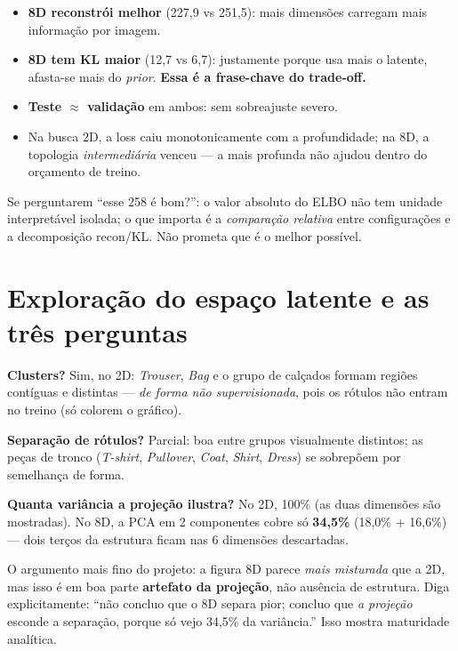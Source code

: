 \documentclass[11pt,a4paper]{article}
\begin{document}
\begin{itemize}[leftmargin=1.2em, itemsep=0.1em]
\item \textbf{8D reconstrói melhor} (227,9 vs 251,5): mais dimensões carregam
mais informação por imagem.
\item \textbf{8D tem KL maior} (12,7 vs 6,7): justamente porque usa mais o
latente, afasta-se mais do \textit{prior}. \textbf{Essa é a frase-chave do
trade-off.}
\item \textbf{Teste $\approx$ validação} em ambos: sem sobreajuste severo.
\item Na busca 2D, a loss caiu monotonicamente com a profundidade; na 8D, a
topologia \emph{intermediária} venceu --- a mais profunda não ajudou dentro do
orçamento de treino.
\end{itemize}

\begin{dica}
Se perguntarem ``esse 258 é bom?'': o valor absoluto do ELBO não tem unidade
interpretável isolada; o que importa é a \emph{comparação relativa} entre
configurações e a decomposição recon/KL. Não prometa que é o melhor possível.
\end{dica}

\section{Exploração do espaço latente e as três perguntas}

\textbf{Clusters?} Sim, no 2D: \textit{Trouser}, \textit{Bag} e o grupo de
calçados formam regiões contíguas e distintas --- \emph{de forma não
supervisionada}, pois os rótulos não entram no treino (só colorem o gráfico).

\textbf{Separação de rótulos?} Parcial: boa entre grupos visualmente distintos;
as peças de tronco (\textit{T-shirt}, \textit{Pullover}, \textit{Coat},
\textit{Shirt}, \textit{Dress}) se sobrepõem por semelhança de forma.

\textbf{Quanta variância a projeção ilustra?} No 2D, 100\% (as duas dimensões
são mostradas). No 8D, a PCA em 2 componentes cobre só \textbf{34,5\%}
(18,0\% + 16,6\%) --- dois terços da estrutura ficam nas 6 dimensões
descartadas.

\begin{dica}
O argumento mais fino do projeto: a figura 8D parece \emph{mais misturada} que a
2D, mas isso é em boa parte \textbf{artefato da projeção}, não ausência de
estrutura. Diga explicitamente: ``não concluo que o 8D separa pior; concluo que
\emph{a projeção} esconde a separação, porque só vejo 34,5\% da variância.''
Isso mostra maturidade analítica.
\end{dica}
\end{document}
